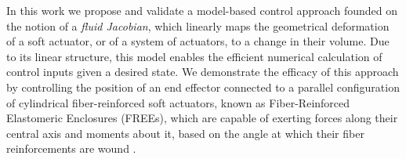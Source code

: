 In this work we propose and validate a model-based control approach founded on the notion of a \emph{fluid Jacobian}, which linearly maps the geometrical deformation of a soft actuator, or of a system of actuators, to a change in their volume. 
Due to its linear structure, this model enables the efficient numerical calculation of control inputs given a desired state.
We demonstrate the efficacy of this approach by controlling the position of an end effector connected to a parallel configuration of cylindrical fiber-reinforced soft actuators, known as Fiber-Reinforced Elastomeric Enclosures (FREEs), which are capable of exerting forces along their central axis and moments about it, based on the angle at which their fiber reinforcements are wound \cite{bishop2015design, connolly2015mechanical, felt2018closed, krishnan2015kinematics, bishop2013force, bruder2017model, sedal2017constitutive}.












